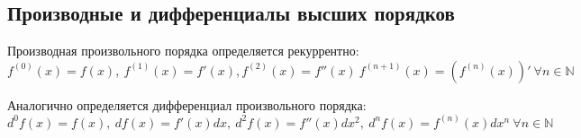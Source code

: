\subsection{Производные и дифференциалы высших порядков}
Производная произвольного порядка определяется рекуррентно:
\begin{equation*}
f^{(0)}(x) = f(x), \ f^{(1)}(x) = f'(x), f^{(2)}(x) = f''(x) \ f^{(n + 1)}(x) = (f^{(n)}(x))' \ \forall n \in \mathbb N
\end{equation*}

Аналогично определяется дифференциал произвольного порядка:
\begin{equation*}
d^0 f(x) = f(x), \ df(x) = f'(x)dx, \ d^2 f(x) = f''(x) dx^2, \ d^n f(x) = f^{(n)}(x) dx^n \ \forall n \in \mathbb N
\end{equation*}